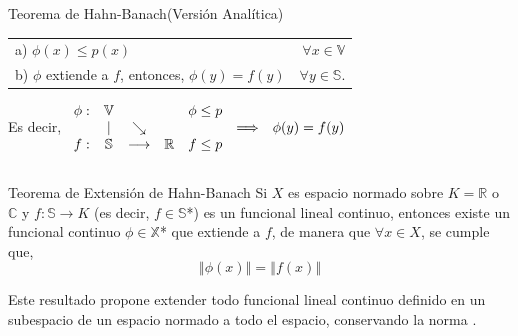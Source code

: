 \documentclass[24pt,final]{beamer}
\newlength{\onecolwid}
\newlength{\twocolwid}
\begin{document}
\begin{frame}[t]
\begin{columns}[t]
\begin{column}{\twocolwid}
\begin{alertblock}{Teorema de Hahn-Banach(Versión Analítica)}
\begin{tabular}{l  r}
a)	 $ \phi(x) \leq p(x)$ & $ \forall x \in \mathbb{V}$\\
b)	 $\phi$ extiende a $f$, entonces, $\phi(y) = f(y)$ & $\forall y \in \mathbb{S}$.\\[1cm]
\end{tabular} 
\begin{center}

Es decir,   $
\begin{array}[c]{c c c c c c l}%
\phi: & \mathbb{V} & & & \phi \leq p            & & \\
& \mid & \searrow & &                   & \Longrightarrow & \phi(y) = f(y)\\ 
f: & \mathbb{S} & \longrightarrow & \mathbb{R} & f \leq p & & \end{array} $
\end{center}

\end{alertblock} 


\begin{columns}[t,totalwidth=\twocolwid] %

\begin{column}{\onecolwid} %


\begin{block}{Teorema de Extensión de Hahn-Banach}
 Si $X$ es espacio normado sobre $K = \mathbb{R}$ o $\mathbb{C}$ y $f \colon \mathbb{S} \to K $ (es decir, $f \in \mathbb{S}$*) es un funcional lineal continuo, entonces existe un funcional continuo $ \phi \in \mathbb{X}$* que extiende a $ f $, de manera que $\forall x \in X$, se cumple que,\\ \[ \left \Vert \phi(x)  \right \Vert = \left \Vert f(x) \right \Vert \] 
 
 Este resultado propone extender todo funcional lineal continuo definido en un subespacio de un espacio normado a todo el espacio, conservando la norma \cite{Cabello:2009qr}.

\end{block}



\end{column}
\end{columns}
\end{column}
\end{columns}
\end{frame}
\end{document}
